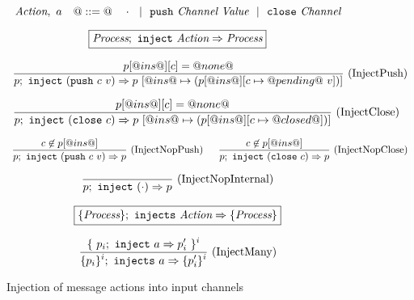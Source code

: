 
\begin{figure}

$$
\textit{Action},~a  ~~~ @::=@ ~~~ \cdot ~~|~~ \texttt{push}~\textit{Channel}~\textit{Value} ~~|~~ \texttt{close}~\textit{Channel}
$$

$$
\boxed{\textit{Process};~\texttt{inject}~\textit{Action} \Rightarrow \textit{Process}}
$$

$$
\enskip \frac {\displaystyle 
  p[@ins@][c] = @none@
} {\displaystyle 
  p;~\texttt{inject}~(\texttt{push}~c~v) \Rightarrow p~[@ins@ \mapsto (p[@ins@][c \mapsto @pending@~v]) ] 
} \  \mbox{(InjectPush)} \enskip
$$

$$
\enskip \frac {\displaystyle 
  p[@ins@][c] = @none@
} {\displaystyle 
  p;~\texttt{inject}~(\texttt{close}~c) \Rightarrow p~[@ins@ \mapsto (p[@ins@][c \mapsto @closed@]) ] 
} \  \mbox{(InjectClose)} \enskip
$$

$$
\ruleIN{
  c \not\in p[@ins@]
}{
  \ProcInject{p}{(\Push~c~v)}{p}
}{InjectNopPush}
%
\enskip
%
\ruleIN{
  c \not\in p[@ins@]
}{
  \ProcInject{p}{(\Close~c)}{p}
}{InjectNopClose}
$$

$$
\enskip \frac {\displaystyle } {\displaystyle 
  p;~\texttt{inject}~(\cdot) \Rightarrow p
} \  \mbox{(InjectNopInternal)} \enskip
$$


$$
\boxed{\{ \textit{Process} \};~\texttt{injects}~\textit{Action} \Rightarrow \{ \textit{Process} \}}
$$

$$
\enskip \frac {\displaystyle 
  \{~ p_i;~\texttt{inject}~a \Rightarrow p'_i ~\}^i
} {\displaystyle 
  \{ p_i \}^i;~\texttt{injects}~a \Rightarrow \{ p'_i \}^i
} \  \mbox{(InjectMany)} \enskip
$$

\caption{Injection of message actions into input channels}
\label{fig:Process:Eval:Inject}
\end{figure}


